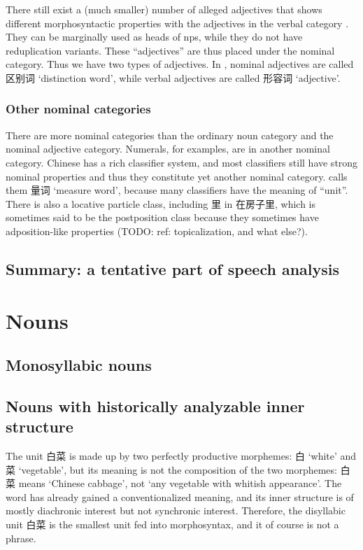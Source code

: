 \documentclass[UTF8, a4paper, oneside, scheme=plain, 12pt]{ctexrep}
\newcommand*{\citechap}[1]{chap.~{#1}}
\newcommand{\translate}[1]{`#1'}
\begin{document}
There still exist a (much smaller) number of alleged adjectives that shows 
different morphosyntactic properties with the adjectives in the verbal category 
\citep[\citechap{5}]{paul2014new}.
They can be marginally used as heads of \ac{np}s,
while they do not have reduplication variants.
These ``adjectives'' are thus placed under the nominal category.
Thus we have two types of adjectives.
In \citet{zhudexigrammar}, 
nominal adjectives are called 区别词 \translate{distinction word},
while verbal adjectives are called 形容词 \translate{adjective}.

\subsubsection{Other nominal categories}

There are more nominal categories than the ordinary noun category and the nominal adjective category.
Numerals, for examples, are in another nominal category.
Chinese has a rich classifier system,
and most classifiers still have strong nominal properties
and thus they constitute yet another nominal category.
\citet{zhudexigrammar} calls them 量词 \translate{measure word},
because many classifiers have the meaning of ``unit''.
There is also a locative particle class, including 里 in 在房子里,
which is sometimes said to be the postposition class
because they sometimes have adposition-like properties (TODO: ref: topicalization, and what else?).


\subsection{Summary: a tentative part of speech analysis}

\section{Nouns}

\subsection{Monosyllabic nouns}

\subsection{Nouns with historically analyzable inner structure}\label{sec:pos.noun.fossilized-structure}

The unit 白菜 is made up by two perfectly productive morphemes:
白 \translate{white} and 菜 \translate{vegetable},
but its meaning is not the composition of the two morphemes:
白菜 means \translate{Chinese cabbage}, not \translate{any vegetable with whitish appearance}.
The word has already gained a conventionalized meaning,
and its inner structure is of mostly diachronic interest but not synchronic interest.
Therefore, the disyllabic unit 白菜 is the smallest unit fed into morphosyntax,
and it of course is not a phrase.
\end{document}
